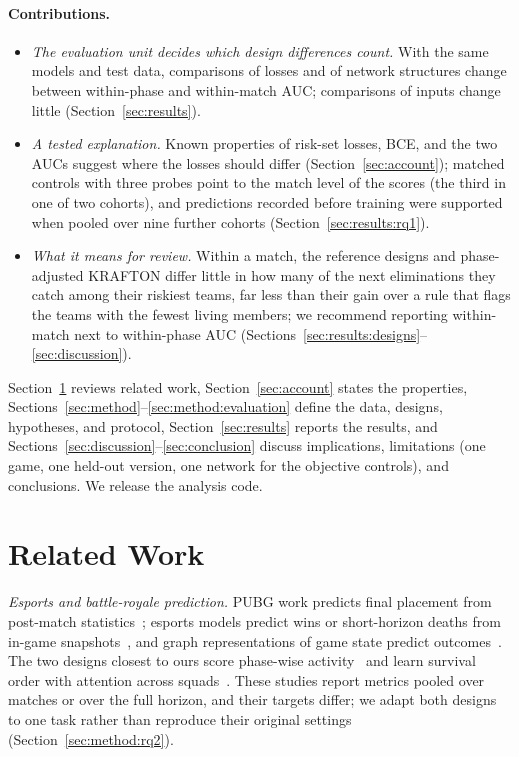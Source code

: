 \documentclass[sigconf,anonymous]{acmart}
\begin{document}
\paragraph{Contributions.}
\begin{itemize}
\item \emph{The evaluation unit decides which design differences count.} With the same models and test data, comparisons of losses and of network structures change between within-phase and within-match AUC; comparisons of inputs change little (Section~\ref{sec:results}).
\item \emph{A tested explanation.} Known properties of risk-set losses, BCE, and the two AUCs suggest where the losses should differ (Section~\ref{sec:account}); matched controls with three probes point to the match level of the scores (the third in one of two cohorts), and predictions recorded before training were supported when pooled over nine further cohorts (Section~\ref{sec:results:rq1}).
\item \emph{What it means for review.} Within a match, the reference designs and phase-adjusted KRAFTON differ little in how many of the next eliminations they catch among their riskiest teams, far less than their gain over a rule that flags the teams with the fewest living members; we recommend reporting within-match next to within-phase AUC (Sections~\ref{sec:results:designs}--\ref{sec:discussion}).
\end{itemize}
Section~\ref{sec:related} reviews related work, Section~\ref{sec:account} states the properties, Sections~\ref{sec:method}--\ref{sec:method:evaluation} define the data, designs, hypotheses, and protocol, Section~\ref{sec:results} reports the results, and Sections~\ref{sec:discussion}--\ref{sec:conclusion} discuss implications, limitations (one game, one held-out version, one network for the objective controls), and conclusions. We release the analysis code.

\section{Related Work}
\label{sec:related}
\emph{Esports and battle-royale prediction.} PUBG work predicts final placement from post-match statistics~\cite{KagglePUBG,LeeLee25}; esports models predict wins or short-horizon deaths from in-game snapshots~\cite{Hodge21,Katona19,Marshall22}, and graph representations of game state predict outcomes~\cite{Xenopoulos21}. The two designs closest to ours score phase-wise activity~\cite{Sagong25a} and learn survival order with attention across squads~\cite{KRAFTON}. These studies report metrics pooled over matches or over the full horizon, and their targets differ; we adapt both designs to one task rather than reproduce their original settings (Section~\ref{sec:method:rq2}).
\end{document}
